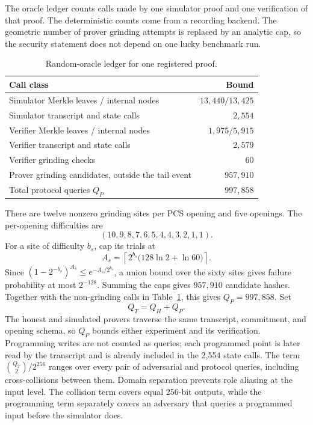 \documentclass[11pt]{article}
\theoremstyle{definition}
\begin{document}
The oracle ledger counts calls made by one simulator proof and one verification
of that proof.  The deterministic counts come from a recording backend.  The
geometric number of prover grinding attempts is replaced by an analytic cap,
so the security statement does not depend on one lucky benchmark run.

\begin{table}[ht]
\centering\small
\caption{Random-oracle ledger for one registered proof.}
\label{tab:ro-ledger}
\begin{tabular}{@{}lr@{}}
\toprule
Call class & Bound \\
\midrule
Simulator Merkle leaves / internal nodes & $13{,}440 / 13{,}425$ \\
Simulator transcript and state calls & $2{,}554$ \\
Verifier Merkle leaves / internal nodes & $1{,}975 / 5{,}915$ \\
Verifier transcript and state calls & $2{,}579$ \\
Verifier grinding checks & $60$ \\
Prover grinding candidates, outside the tail event & $957{,}910$ \\
\midrule
Total protocol queries $Q_P$ & $997{,}858$ \\
\bottomrule
\end{tabular}
\end{table}

There are twelve nonzero grinding sites per PCS opening and five openings.  The
per-opening difficulties are
\[
  (10,9,8,7,6,5,4,4,3,2,1,1).
\]
For a site of difficulty $b_s$, cap its trials at
\[
  A_s=\left\lceil 2^{b_s}\bigl(128\ln2+\ln60\bigr)\right\rceil.
\]
Since $(1-2^{-b_s})^{A_s}\le e^{-A_s/2^{b_s}}$, a union bound over the sixty
sites gives failure probability at most $2^{-128}$.  Summing the caps gives
$957{,}910$ candidate hashes.  Together with the non-grinding calls in
Table~\ref{tab:ro-ledger}, this gives $Q_P=997{,}858$.  Set
\[
  Q_T=Q_H+Q_P.
\]
The honest and simulated provers traverse the same transcript, commitment, and
opening schema, so $Q_P$ bounds either experiment and its verification.
Programming writes are not counted as queries; each programmed point is later
read by the transcript and is already included in the 2,554 state calls.  The
term $\binom{Q_T}{2}/2^{256}$ ranges over every pair of adversarial and protocol
queries, including cross-collisions between them.  Domain separation prevents
role aliasing at the input level.  The collision term covers equal 256-bit
outputs, while the programming term separately covers an adversary that
queries a programmed input before the simulator does.
\end{document}
